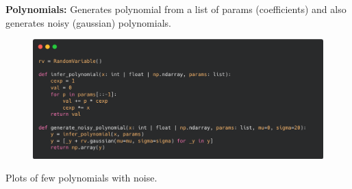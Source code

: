 \documentclass[12pt]{article}
\begin{document}
\raggedright \textbf{Polynomials:} \newline
Generates polynomial from a list of params (coefficients) and also generates noisy (gaussian) polynomials.
\begin{figure}[H] 
\centering \includegraphics[scale=0.25]{code-poly.png}  
\end{figure}
Plots of few polynomials with noise.
\end{document}
